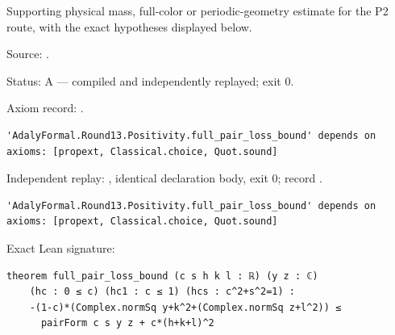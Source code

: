 \begin{theorem}[bp-457]
\label{bp-457}
\uses{}
\leanok
Supporting physical mass, full-color or periodic-geometry estimate for the P2 route, with the exact hypotheses displayed below.

\par Source: \texttt{}.
\par Status: A — compiled and independently replayed; exit 0.
\par Axiom record: \texttt{}.
\begin{verbatim}
'AdalyFormal.Round13.Positivity.full_pair_loss_bound' depends on axioms: [propext, Classical.choice, Quot.sound]
\end{verbatim}
\par Independent replay: \texttt{}, identical declaration body, exit 0; record \texttt{}.
\begin{verbatim}
'AdalyFormal.Round13.Positivity.full_pair_loss_bound' depends on axioms: [propext, Classical.choice, Quot.sound]
\end{verbatim}
\par Exact Lean signature:
\begin{verbatim}
theorem full_pair_loss_bound (c s h k l : ℝ) (y z : ℂ)
    (hc : 0 ≤ c) (hc1 : c ≤ 1) (hcs : c^2+s^2=1) :
    -(1-c)*(Complex.normSq y+k^2+(Complex.normSq z+l^2)) ≤
      pairForm c s y z + c*(h+k+l)^2
\end{verbatim}
\end{theorem}

